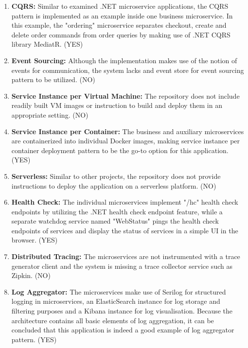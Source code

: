 \documentclass{Configuration_Files/PoliMi3i_thesis}
\begin{document}
\begin{enumerate}
    \item \textbf{CQRS:} Similar to examined .NET microservice applications, the CQRS pattern is implemented as an example inside one business microservice.
    In this example, the "ordering" microservice separates checkout, create and delete order commands from order queries by making use of .NET CQRS library MediatR. (YES)
    
    \item \textbf{Event Sourcing:} Although the implementation makes use of the notion of events for communication, the system lacks and event store for event sourcing pattern to be utilized. (NO)
    
    \item \textbf{Service Instance per Virtual Machine:} The repository does not include readily built VM images or instruction to build and deploy them in an appropriate setting. (NO)
    
    \item \textbf{Service Instance per Container:} The business and auxiliary microservices are containerized into individual Docker images, making service instance per container deployment pattern to be the go-to option for this application. (YES)
    
    \item \textbf{Serverless:} Similar to other projects, the repository does not provide instructions to deploy the application on a serverless platform. (NO)
    
    \item \textbf{Health Check:} The individual microservices implement "/hc" health check endpoints by utilizing the .NET health check endpoint feature, while a separate watchdog service named "WebStatus" pings the health check endpoints of services and display the status of services in a simple UI in the browser. (YES)
    
    \item \textbf{Distributed Tracing:} The microservices are not instrumented with a trace generator client and the system is missing a trace collector service such as Zipkin. (NO)
    
    \item \textbf{Log Aggregator:} The microservices make use of Serilog for structured logging in microservices, an ElasticSearch instance for log storage and filtering purposes and a Kibana instance for log visualisation.
    Because the architecture contains all basic elements of log aggregation, it can be concluded that this application is indeed a good example of log aggregator pattern. (YES)
    

\end{enumerate}
\end{document}
